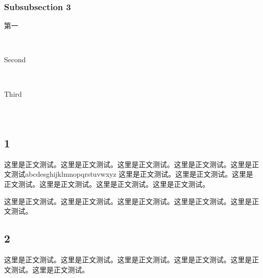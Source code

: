 \documentclass[12pt,a4paper]{article} %
\begin{document}

\subsubsection{Subsubsection 3} %

\begin{description} %

\item[第一] \hfill \\
\lipsum[9] %

\item[Second] \hfill \\
\lipsum[10] %

\item[Third] \hfill \\
\lipsum[11] %

\end{description} 


\section{}

\subsection{ 1} %

{\kai 这里是正文测试。这里是正文测试。这里是正文测试。这里是正文测试。这里是正文测试}{\hei abcdesghijklmnopqrstuvwxyz} 这里是正文测试。这里是正文测试。这里是正文测试。这里是正文测试。这里是正文测试。这里是正文测试。

{\kai 这里是正文测试。这里是正文测试。这里是正文测试。这里是正文测试。这里是正文测试。}


\subsection{ 2} %

这里是正文测试。这里是正文测试。这里是正文测试。这里是正文测试。这里是正文测试。这里是正文测试。
\end{document}
